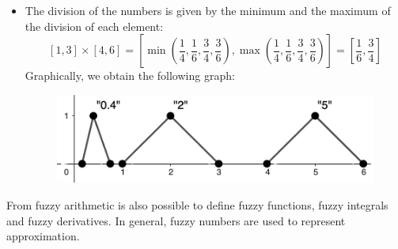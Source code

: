\documentclass[12pt, a4paper]{report}
\newtheorem[style=M,bodystyle=\normalfont]{theorem}{Theorem}
\newtheorem[style=M,bodystyle=\normalfont]{corollary}{Corollary}
\newtheorem[style=M,bodystyle=\normalfont]{lemma}{Lemma}
\newtheorem[style=M,bodystyle=\normalfont]{definition}{Definition}
\begin{document}
\begin{example}
\begin{itemize}
            \item The division of the numbers is given by the minimum and the maximum of the division of each element:
            \[[1,3] \times [4,6]=[\min(\frac{1}{4}, \frac{1}{6}, \frac{3}{4}, \frac{3}{6}),\max(\frac{1}{4}, \frac{1}{6}, \frac{3}{4}, \frac{3}{6})]=[\frac{1}{6},\frac{3}{4}]\]
                Graphically, we obtain the following graph:
                \begin{figure}[H]
                    \centering
                    \includegraphics[width=0.5\linewidth]{images/division.png}
                \end{figure}
        \end{itemize}
    \end{example}
    
    From fuzzy arithmetic is also possible to define fuzzy functions, fuzzy integrals and fuzzy derivatives. In general, fuzzy numbers are used 
    to represent approximation.
\end{document}
